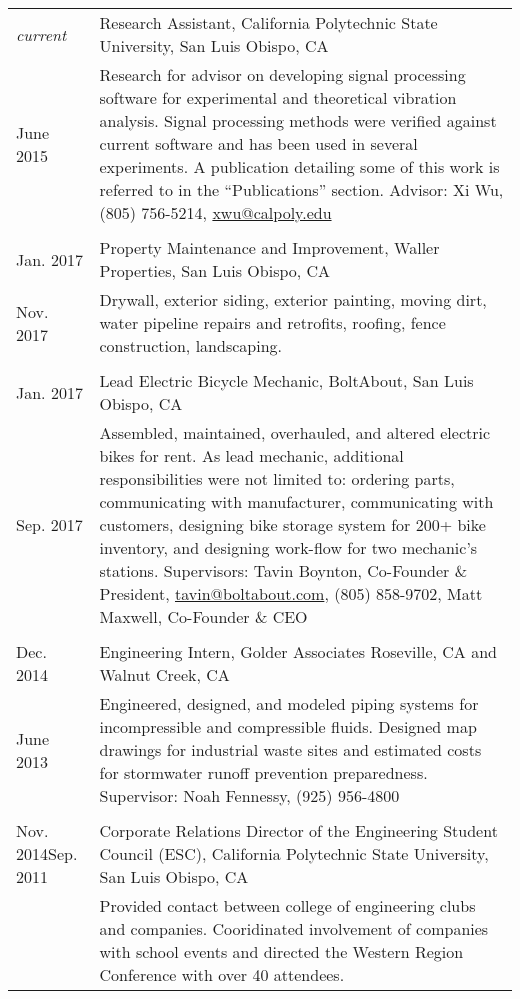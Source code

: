 \documentclass[10pt]{article} %
\begin{document}
	\begin{tabular}{p{.6in}|p{5.5in}}
		\emph{current}& Research Assistant, California Polytechnic State University, San Luis Obispo, CA \\
		June 2015& \footnotesize{Research for advisor on developing signal processing software for experimental and theoretical vibration analysis. Signal processing methods were verified against current software and has been used in several experiments. A publication detailing some of this work is referred to in the ``Publications'' section. Advisor: Xi Wu, (805) 756-5214}, \href{mailto:xwu@calpoly.edu}{xwu@calpoly.edu}\\
		\multicolumn{2}{c}{} \\		
		
		Jan. 2017& Property Maintenance and Improvement, Waller Properties, San Luis Obispo, CA\\
		Nov. 2017& \footnotesize{Drywall, exterior siding, exterior painting, moving dirt, water pipeline repairs and retrofits, roofing, fence construction, landscaping.}\\
		\multicolumn{2}{c}{} \\
		
		Jan. 2017& Lead Electric Bicycle Mechanic, BoltAbout, San Luis Obispo, CA\\
		Sep. 2017& \footnotesize{Assembled, maintained, overhauled, and altered electric bikes for rent. As lead mechanic, additional responsibilities were not limited to: ordering parts, communicating with manufacturer, communicating with customers, designing bike storage system for 200+ bike inventory, and designing work-flow for two mechanic's stations. Supervisors: Tavin Boynton, Co-Founder \& President, \href{mailto:tavin@boltabout.com}{tavin@boltabout.com}, (805) 858-9702, Matt Maxwell, Co-Founder \& CEO}\\
		\multicolumn{2}{c}{} \\
		
		Dec. 2014& Engineering Intern, Golder Associates Roseville, CA and Walnut Creek, CA \\
		June 2013&\footnotesize{Engineered, designed, and modeled piping systems for incompressible and compressible fluids. Designed map drawings for industrial waste sites and estimated costs for stormwater runoff prevention preparedness. Supervisor: Noah Fennessy, (925) 956-4800}\\
		\multicolumn{2}{c}{} \\		
		
		Nov. 2014\newline Sep. 2011& Corporate Relations Director of the Engineering Student Council (ESC), California Polytechnic State University, San Luis Obispo, CA\\
		& \footnotesize{Provided contact between college of engineering clubs and companies. Cooridinated involvement of companies with school events and directed the Western Region Conference with over 40 attendees.}\\
		
	\end{tabular}
\end{document}
